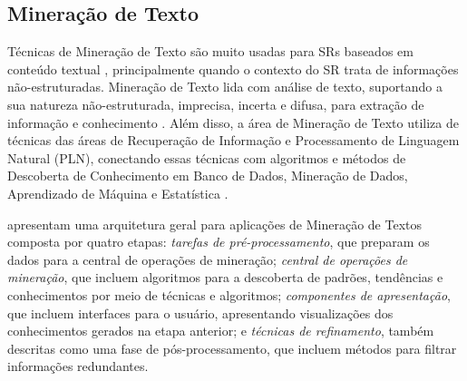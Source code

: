 \documentclass[
    12pt,                %
    oneside,            %
    a4paper,            %
    english,            %
    brazil                %
    ]{abntex2ppgsi}
\begin{document}
%
%


\begin{apendicesenv}


%
%
%

\chapter{Mineração de Texto}
\label{sec:mintexto}

Técnicas de Mineração de Texto são muito usadas para SRs baseados em conteúdo textual \cite{Lops2011}, principalmente quando o contexto do SR trata de informações não-estruturadas. Mineração de Texto lida com análise de texto, suportando a sua natureza não-estruturada, imprecisa, incerta e difusa, para extração de informação e conhecimento \cite{Hotho2005}.
Além disso, a área de Mineração de Texto utiliza de técnicas das áreas de Recuperação de Informação e Processamento de Linguagem Natural (PLN), conectando essas técnicas com algoritmos e métodos de Descoberta de Conhecimento em Banco de Dados, Mineração de Dados, Aprendizado de Máquina e Estatística \cite{Hotho2005}.


 apresentam uma arquitetura geral para aplicações de Mineração de Textos composta por quatro etapas: \textit{tarefas de pré-processamento}, que preparam os dados para a central de operações de mineração; \textit{central de operações de mineração}, que incluem algoritmos para a descoberta de padrões, tendências e conhecimentos por meio de técnicas e algoritmos; \textit{componentes de apresentação}, que incluem interfaces para o usuário, apresentando visualizações dos conhecimentos gerados na etapa anterior; e \textit{técnicas de refinamento}, também descritas como uma fase de pós-processamento, que incluem métodos para filtrar informações redundantes.


\end{apendicesenv}
\end{document}
